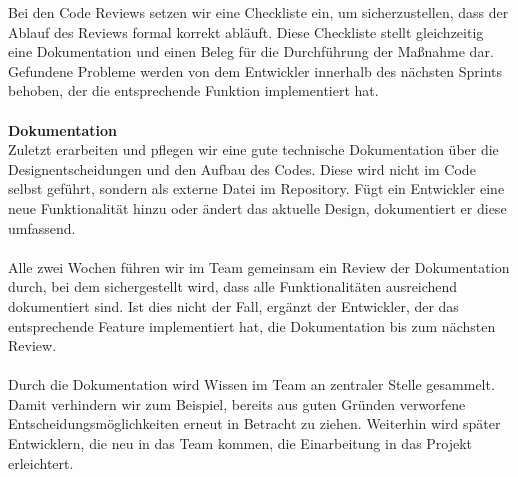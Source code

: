 \documentclass[accentcolor=tud0b,12pt,paper=a4]{tudreport}
\begin{document}
      Bei den Code Reviews setzen wir eine Checkliste ein, um sicherzustellen, dass der Ablauf des Reviews formal korrekt abläuft. Diese Checkliste stellt gleichzeitig eine Dokumentation und einen Beleg für die Durchführung der Maßnahme dar. Gefundene Probleme werden von dem Entwickler innerhalb des nächsten Sprints behoben, der die entsprechende Funktion implementiert hat.\\\\
      \textbf{Dokumentation}\\
      Zuletzt erarbeiten und pflegen wir eine gute technische Dokumentation über die Designentscheidungen und den Aufbau des Codes. Diese wird nicht im Code selbst geführt, sondern als externe Datei im Repository. Fügt ein Entwickler eine neue Funktionalität hinzu oder ändert das aktuelle Design, dokumentiert er diese umfassend.\\\\
      Alle zwei Wochen führen wir im Team gemeinsam ein Review der Dokumentation durch, bei dem sichergestellt wird, dass alle Funktionalitäten ausreichend dokumentiert sind. Ist dies nicht der Fall, ergänzt der Entwickler, der das entsprechende Feature implementiert hat, die Dokumentation bis zum nächsten Review.\\\\
      Durch die Dokumentation wird Wissen im Team an zentraler Stelle gesammelt. Damit verhindern wir zum Beispiel, bereits aus guten Gründen verworfene Entscheidungsmöglichkeiten erneut in Betracht zu ziehen. Weiterhin wird später Entwicklern, die neu in das Team kommen, die Einarbeitung in das Projekt erleichtert.
\end{document}
